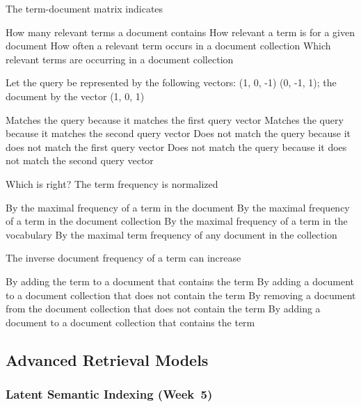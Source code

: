 \documentclass[12pt,a4paper,answers]{exam} %
\begin{document}
\begin{flushleft}
\begin{multicols*}{2}
\begin{questions}
\question The term-document matrix indicates
\begin{checkboxes}
\CorrectChoice How many relevant terms a document contains
\choice How relevant a term is for a given document
\CorrectChoice How often a relevant term occurs in a document collection
\CorrectChoice Which relevant terms are occurring in a document collection
\end{checkboxes}

\question Let the query be represented by the following vectors:
(1, 0, -1) (0, -1, 1); the document by the vector (1, 0, 1)
\begin{checkboxes}
\choice Matches the query because it matches the first query vector
\CorrectChoice Matches the query because it matches the second query vector
\choice Does not match the query because it does not match the first query vector
\choice Does not match the query because it does not match the second query vector
\end{checkboxes}

\question Which is right? The term frequency is normalized
\begin{checkboxes}
\CorrectChoice By the maximal frequency of a term in the document
\choice By the maximal frequency of a term in the document collection
\choice By the maximal frequency of a term in the vocabulary
\choice By the maximal term frequency of any document in the collection
\end{checkboxes}


\question The inverse document frequency of a term can increase
\begin{checkboxes}
\choice By adding the term to a document that contains the term
\CorrectChoice By adding a document to a document collection that does not
contain the term
\choice By removing a document from the document collection that
does not contain the term
\choice By adding a document to a document collection that contains
the term
\end{checkboxes}



\subsection{Advanced Retrieval Models} %

\subsubsection{Latent Semantic Indexing (Week~5)}



\end{questions}
\end{multicols*}
\end{flushleft}
\end{document}
